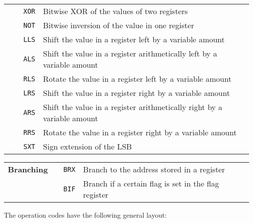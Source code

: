 \documentclass[twoside]{article}
\newcounter{magicrownumbers}
\newcommand\rownumber{\stepcounter{magicrownumbers}\arabic{magicrownumbers}}
\begin{document}
\begin{table}[H]
\begin{longtable}{p{}p{}p{}p{}}
                     & \rownumber & \texttt{XOR} & Bitwise XOR of the values of two registers\\
                     & \rownumber & \texttt{NOT} & Bitwise inversion of the value in one register\\
                     & \rownumber & \texttt{LLS} & Shift the value in a register left by a variable amount\\
                     & \rownumber & \texttt{ALS} & Shift the value in a register arithmetically left by a variable amount\\
                     & \rownumber & \texttt{RLS} & Rotate the value in a register left by a variable amount\\
                     & \rownumber & \texttt{LRS} & Shift the value in a register right by a variable amount\\
                     & \rownumber & \texttt{ARS} & Shift the value in a register arithmetically right by a variable amount\\
                     & \rownumber & \texttt{RRS} & Rotate the value in a register right by a variable amount\\
                     & \rownumber & \texttt{SXT} & Sign extension of the LSB\\
	\end{longtable}
	\begin{longtable}{p{}p{}p{}p{}}
        \textbf{Branching} & \rownumber & \texttt{BRX} & Branch to the address stored in a register\\
                           & \rownumber & \texttt{BIF} & Branch if a certain flag is set in the flag register\\
    \end{longtable}
\end{table}\noindent
The operation codes have the following general layout:\par
\end{document}
